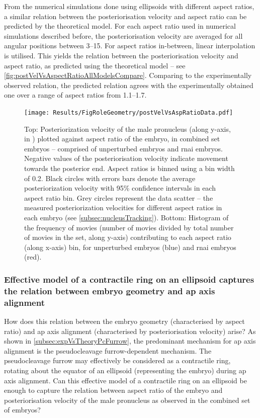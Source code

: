 From the numerical simulations done using ellipsoids with different aspect ratios, a similar relation between the posteriorisation velocity and aspect ratio can be predicted by the theoretical model. For each aspect ratio used in numerical simulations described before, the posteriorisation velocity are averaged for all angular positions between \SIrange{3}{15}{\unitAngle}. For aspect ratios in-between, linear interpolation is utilised. This yields the relation between the posteriorisation velocity and aspect ratio, as predicted using the theoretical model -- see \autoref{fig:postVelVsAspectRatioAllModelsCompare}. Comparing to the experimentally observed relation, the predicted relation agrees with the experimentally obtained one over a range of aspect ratios from \numrange{1.1}{1.7}.

\begin{figure}[p]
\centering
\texttt{[image: Results/FigRoleGeometry/postVelVsAspRatioData.pdf]}
\caption[Posteriorisation velocity of the male pronucleus in unperturbed and  \acs{rnai} embryos with respect to aspect ratio]{Top: Posteriorization velocity of the male pronucleus (along y-axis, in \si{\unitPostVel}) plotted against aspect ratio of the embryo, in combined set embryos -- comprised of unperturbed embryos and  \ac{rnai} embryos. Negative values of the posteriorisation velocity indicate movement towards the posterior end. Aspect ratios is binned using a bin width of \num{0.2}. Black circles with errors bars denote the average posteriorization velocity with \num{95}\% confidence intervals in each aspect ratio bin. Grey circles represent the data scatter -- the measured posteriorization velocities for different aspect ratios in each embryo (see \autoref{subsec:nucleusTracking}). Bottom: Histogram of the frequency of movies (number of movies divided by total number of movies in the set, along y-axis) contributing to each aspect ratio (along x-axis) bin, for unperturbed embryos (blue) and  \ac{rnai} embryos (red).}
\label{fig:swg070CombinedPostVelVsAspectRatio}
\end{figure}

\subsubsection{Effective model of a contractile ring on an ellipsoid captures the relation between embryo geometry and \acs{ap} axis alignment}\label{subsubsec:effectiveModel}

How does this relation between the embryo geometry (characterised by aspect ratio) and \ac{ap} axis alignment (characterised by posteriorisation velocity) arise? As shown in \autoref{subsec:expVsTheoryPcFurrow}, the predominant mechanism for \ac{ap} axis alignment is the pseudocleavage furrow-dependent mechanism. The pseudocleavage furrow may effectively be considered as a contractile ring, rotating about the equator of an ellipsoid (representing the embryo) during \ac{ap} axis alignment. Can this effective model of a contractile ring on an ellipsoid be enough to capture the relation between aspect ratio of the embryo and posteriorisation velocity of the male pronucleus as observed in the combined set of embryos?

